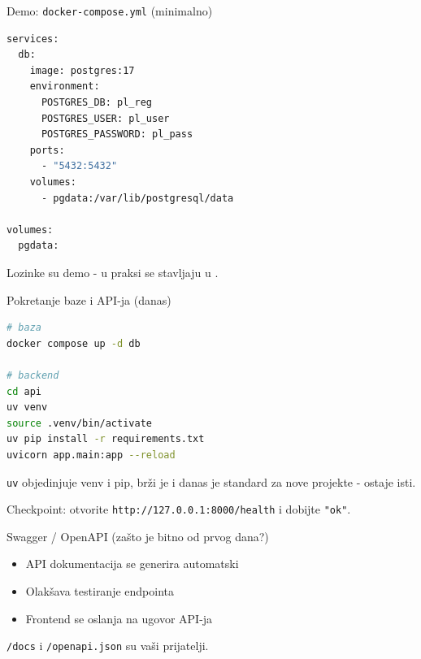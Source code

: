 \begin{frame}[fragile,shrink=5]{Demo: \texttt{docker-compose.yml} (minimalno)}
\begin{lstlisting}[language=bash]
services:
  db:
    image: postgres:17
    environment:
      POSTGRES_DB: pl_reg
      POSTGRES_USER: pl_user
      POSTGRES_PASSWORD: pl_pass
    ports:
      - "5432:5432"
    volumes:
      - pgdata:/var/lib/postgresql/data

volumes:
  pgdata:
\end{lstlisting}

\vspace{0.4em}
Lozinke su demo - u praksi se stavljaju u .
\end{frame}

\begin{frame}[fragile,shrink=5]{Pokretanje baze i API-ja (danas)}
\begin{lstlisting}[language=bash]
# baza
docker compose up -d db

# backend
cd api
uv venv
source .venv/bin/activate
uv pip install -r requirements.txt
uvicorn app.main:app --reload
\end{lstlisting}

\vspace{0.4em}
\texttt{uv} objedinjuje venv i pip, brži je i danas je standard za nove projekte -  ostaje isti.

\vspace{0.4em}
Checkpoint: otvorite \texttt{http://127.0.0.1:8000/health} i dobijte \texttt{"ok"}.
\end{frame}

\begin{frame}{Swagger / OpenAPI (zašto je bitno od prvog dana?)}
\begin{itemize}
  \item API dokumentacija se generira automatski
  \item Olakšava testiranje endpointa
  \item Frontend se oslanja na ugovor API-ja
\end{itemize}

\vspace{0.6em}
\texttt{/docs} i \texttt{/openapi.json} su vaši prijatelji.
\end{frame}

